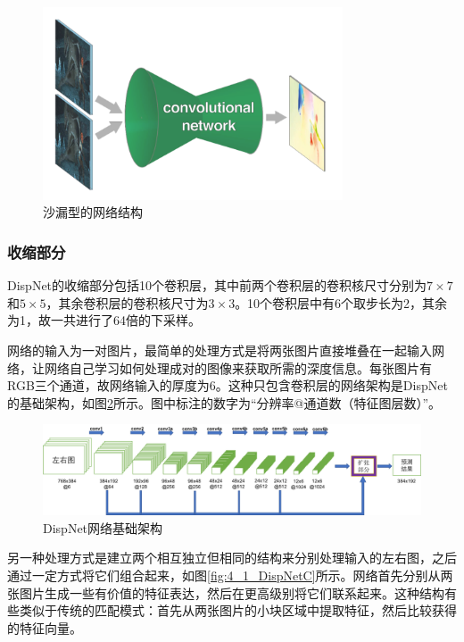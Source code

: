 \begin{figure}[!htbp]
	\centering\includegraphics[width=3.5in]{figures/4_1_dispnet_shape.png}
	\caption{沙漏型的网络结构\cite{dosovitskiy2015flownet}}\label{fig:4_1_dispnet_shape}
\end{figure}

\subsubsection{收缩部分}
DispNet的收缩部分包括10个卷积层，其中前两个卷积层的卷积核尺寸分别为$7\times 7$和$5\times 5$，其余卷积层的卷积核尺寸为$3\times 3$。10个卷积层中有6个取步长为2，其余为1，故一共进行了64倍的下采样。

网络的输入为一对图片，最简单的处理方式是将两张图片直接堆叠在一起输入网络，让网络自己学习如何处理成对的图像来获取所需的深度信息。每张图片有RGB三个通道，故网络输入的厚度为6。这种只包含卷积层的网络架构是DispNet的基础架构，如图\ref{fig:4_1_DispNet}所示。图中标注的数字为“分辨率@通道数（特征图层数）”。

\begin{figure}[!htbp]
	\centering\includegraphics[width=6in]{figures/4_1_dispnet_architecture}
	\caption{DispNet网络基础架构}\label{fig:4_1_DispNet}
\end{figure}

另一种处理方式是建立两个相互独立但相同的结构来分别处理输入的左右图，之后通过一定方式将它们组合起来，如图\ref{fig:4_1_DispNetC}所示。网络首先分别从两张图片生成一些有价值的特征表达，然后在更高级别将它们联系起来。这种结构有些类似于传统的匹配模式：首先从两张图片的小块区域中提取特征，然后比较获得的特征向量。

